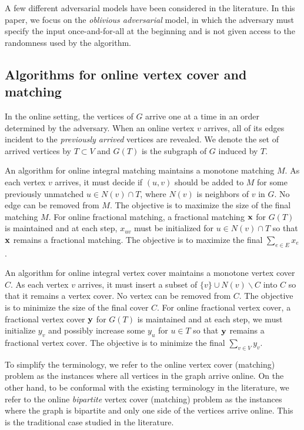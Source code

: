 \documentclass{article}
\newcommand{\bx}{{\bf{x}}}
\newcommand{\by}{{\bf{y}}}
\begin{document}
A few different adversarial models have been considered in the literature. In this paper, we focus on the {\em oblivious adversarial} model, in which the adversary must specify the input once-and-for-all at the beginning and is not given access to the randomness used by the algorithm. 
\subsection{Algorithms for online vertex cover and matching}
In the online setting, the vertices of $G$ arrive one at a time in an order determined by the adversary. When an online vertex $v$ arrives, all of its edges incident to the {\em previously arrived} vertices are revealed. We denote the set of arrived vertices by $T\subset V$ and $G(T)$ is the subgraph of $G$ induced by $T$.



An algorithm for online integral matching maintains a monotone matching $M$. As each vertex $v$ arrives, it must decide if $(u,v)$ should be added to $M$ for some previously unmatched $u\in N(v)\cap T$, where $N(v)$ is neighbors of $v$ in $G$. No edge can be removed from $M$. The objective is to maximize the size of the final matching $M$. For online fractional matching, a fractional matching $\bx$ for $G(T)$ is maintained and at each step, $x_{uv}$ must be initialized for $u\in N(v)\cap T$ so that $\bx$ remains a fractional matching. The objective is to maximize the final $\sum_{e\in E} x_e$.

An algorithm for online integral vertex cover maintains a monotone vertex cover $C$. As each vertex $v$ arrives, it must insert a subset of $\{v\}\cup N(v)\backslash C$ into $C$ so that it remains a vertex cover. No vertex can be removed from $C$. The objective is to minimize the size of the final cover $C$. For online fractional vertex cover, a fractional vertex cover $\by$ for $G(T)$ is maintained and at each step, we must initialize $y_v$ and possibly increase some $y_u$ for $u\in T$ so that $\by$ remains a fractional vertex cover. The objective is to minimize the final $\sum_{v\in V}y_v$.

To simplify the terminology, we refer to the online vertex cover (matching) problem as the instances where all vertices in the graph arrive online. On the other hand, to be conformal with the existing terminology in the literature, we refer to the online {\em bipartite} vertex cover (matching) problem as the instances where the graph is bipartite and only one side of the vertices arrive online. This is the traditional case studied in the literature.
\end{document}
